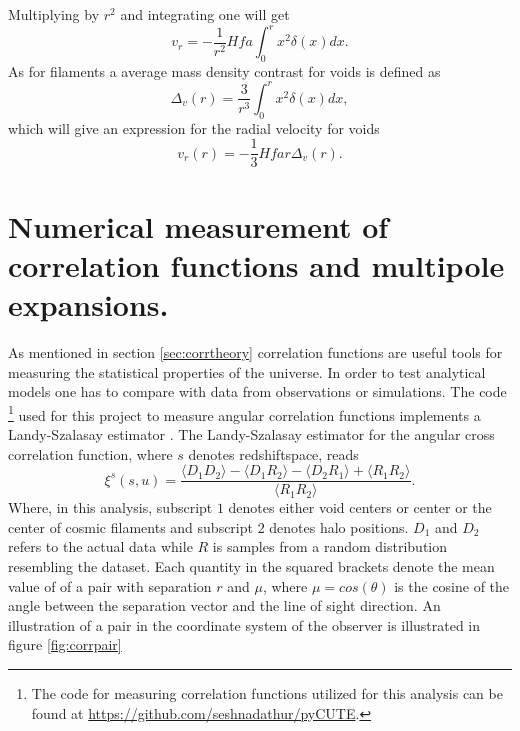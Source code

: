 Multiplying by $r^2$ and integrating one will get
\begin{equation}
    v_r = -\frac{1}{r^2}Hfa\int_0^r x^2\delta(x)dx.
\end{equation}
As for filaments a average mass density contrast for voids is defined as
\begin{equation}\label{eq:contrastvoid}
    \Delta_v(r)=\frac{3}{r^3}\int_0^r x^2\delta(x)dx,
\end{equation}
which will give an expression for the radial velocity for voids
\begin{equation}\label{eq:vrvoid}
    v_r(r)=-\frac{1}{3}Hfar\Delta_v(r).
\end{equation}
\section{Numerical measurement of correlation functions and multipole expansions.}
As mentioned in section \ref{sec:corrtheory} correlation functions are useful
tools for measuring the statistical properties of the universe. In order to test
analytical models one has to compare with data from observations or simulations.
The code \footnote{The code for measuring correlation functions utilized for this analysis can be found at \url{https://github.com/seshnadathur/pyCUTE}.} used for this project to measure angular correlation functions
implements a Landy-Szalasay estimator \cite{Landy}. The Landy-Szalasay estimator
for the angular cross correlation function, where $s$ denotes redshiftspace, reads
\begin{equation}
    \xi^s(s,u)=\frac{\langle D_1D_2\rangle-\langle D_1R_2\rangle-\langle D_2R_1\rangle+\langle R_1R_2\rangle}{\langle R_1R_2\rangle}.
\end{equation}
Where, in this analysis, subscript $1$ denotes either void centers or center or
the center of cosmic filaments and subscript $2$ denotes halo positions. $D_1$
and $D_2$ refers to the actual data while $R$ is samples from a random
distribution resembling the dataset. Each quantity in the squared brackets
denote the mean value of of a pair with separation $r$ and $\mu$, where
$\mu=cos(\theta)$ is the cosine of the angle between the separation vector and
the line of sight direction. An illustration of a pair in the coordinate system
of the observer is illustrated in figure \ref{fig:corrpair}
